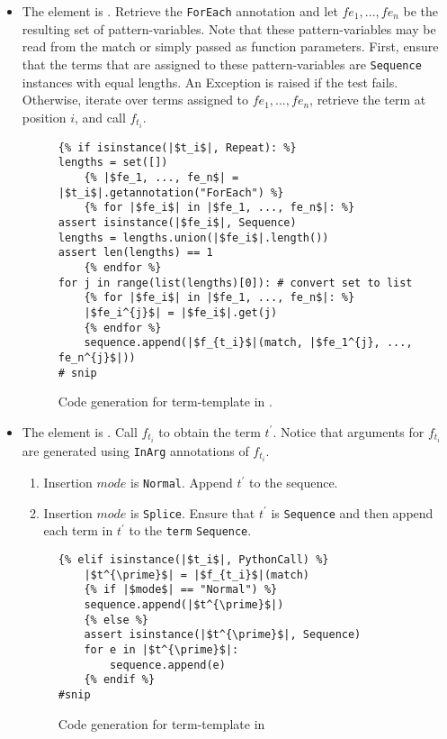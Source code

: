\begin{itemize}
\item
The element is \TermRepeat. Retrieve the \texttt{ForEach} annotation and let $fe_1, ..., fe_n$ be the resulting set of pattern-variables. Note that these pattern-variables may be read from the match or simply passed as function parameters. First, ensure that the terms that are assigned to these pattern-variables are \texttt{Sequence} instances with equal lengths. An Exception is raised if the test fails. Otherwise, iterate over terms assigned to $fe_1, ..., fe_n$, retrieve the term at position $i$, and call $f_{t_i}$.

\begin{figure}
\begin{verbatim}
{% if isinstance(|$t_i$|, Repeat): %}
lengths = set([])
	{% |$fe_1, ..., fe_n$| = |$t_i$|.getannotation("ForEach") %}
	{% for |$fe_i$| in |$fe_1, ..., fe_n$|: %}
assert isinstance(|$fe_i$|, Sequence)
lengths = lengths.union(|$fe_i$|.length())
assert len(lengths) == 1
	{% endfor %}
for j in range(list(lengths)[0]): # convert set to list
	{% for |$fe_i$| in |$fe_1, ..., fe_n$|: %}
	|$fe_i^{j}$| = |$fe_i$|.get(j)
	{% endfor %}
	sequence.append(|$f_{t_i}$|(match, |$fe_1^{j}, ..., fe_n^{j}$|))
# snip
\end{verbatim}
\caption{Code generation for term-template \RepeatNoArg \space in \TermSequenceNoArg.}
\label{codegen-term-sequence-repeat}
\end{figure}

\item
	The element is \PythonCall. Call $f_{t_i}$ to obtain the term $t^{\prime}$. Notice that arguments for $f_{t_i}$ are generated using \texttt{InArg} annotations of $f_{t_i}$.
	\begin{enumerate}
	\item Insertion $mode$ is \texttt{Normal}. Append $t^{\prime}$ to the sequence.
	\item Insertion $mode$ is \texttt{Splice}. Ensure that $t^{\prime}$ is \texttt{Sequence} and then append each term in $t^{\prime}$ to the \texttt{term} \texttt{Sequence}.
	\end{enumerate}

\begin{figure}
\begin{verbatim}
{% elif isinstance(|$t_i$|, PythonCall) %}
	|$t^{\prime}$| = |$f_{t_i}$|(match)
	{% if |$mode$| == "Normal") %}
	sequence.append(|$t^{\prime}$|)
	{% else %}
	assert isinstance(|$t^{\prime}$|, Sequence)
	for e in |$t^{\prime}$|:
		sequence.append(e)
	{% endif %}
#snip
\end{verbatim}
\caption{Code generation for term-template \PythonCallNoArg \space in \TermSequenceNoArg}
\label{codegen-term-sequence-pycall}
\end{figure}


\end{itemize}
